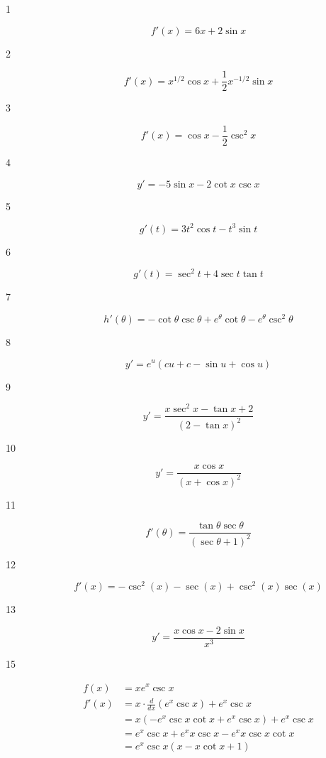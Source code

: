 \documentclass[letterpaper, landscape]{exam}
\begin{document}
  \begin{description}

    \item[1] 
      \[
        f'(x) = \boxed{ 6x + 2 \sin x }
      \]

    \item[2] 
      \[
        f'(x) = \boxed{ x^{1/2} \cos{x} + \frac{1}{2} x^{-1/2} \sin x }
      \]

    \item[3] 
      \[
        f'(x) = \boxed{ \cos x - \frac{1}{2} \csc^2 x }
      \]

    \item[4] 
      \[
        y' = \boxed{ - 5 \sin x - 2 \cot x \csc x }
      \]

    \item[5] 
      \[
        g'(t) = \boxed{ 3 t^2 \cos t - t^3 \sin t }
      \]

    \item[6] 
      \[
        g'(t) = \boxed{ \sec^2 t + 4 \sec t \tan t }
      \]

    \item[7] 
      \[
        h'(\theta) = \boxed{ - \cot \theta \csc \theta + e^{\theta} \cot \theta - e^{\theta} \csc^2 \theta }
      \]

    \item[8] 
      \[
        y' = \boxed{ e^u (c u + c - \sin u + \cos u) }
      \]

    \item[9] 
      \[
        y' = \boxed{ \frac{ x \sec^2 x - \tan x + 2}{( 2 - \tan x )^2} }
      \]

    \item[10] 
      \[
        y' = \boxed{ \frac{x \cos x}{(x + \cos x)^2} }
      \]

    \item[11] 
      \[
        f'(\theta) = \boxed{ \frac{\tan \theta \sec \theta}{(\sec \theta + 1)^2} }
      \]

    \item[12] 
      \[
        f'(x) = \boxed{ - \csc^2(x) - \sec (x) + \csc^2(x) \sec (x) }
      \]

    \item[13] 
      \[
        y' = \boxed{ \frac{x \cos x - 2 \sin x}{x^3} }
      \]

    \item[15] 
      \begin{align*}
        f(x)  & = x e^x \csc x \\
        f'(x) & = x \cdot \frac{d}{dx} \left( e^x \csc x \right) + e^x \csc x \\
              & = x \left( - e^x \csc x \cot x + e^x \csc x  \right)+ e^x \csc x \\
              & = e^x \csc x + e^x x \csc x - e^x x \csc x \cot x \\
              & = \boxed{ e^x \csc x \left( x - x \cot x + 1 \right) } \\
      \end{align*}


\end{description}
\end{document}
